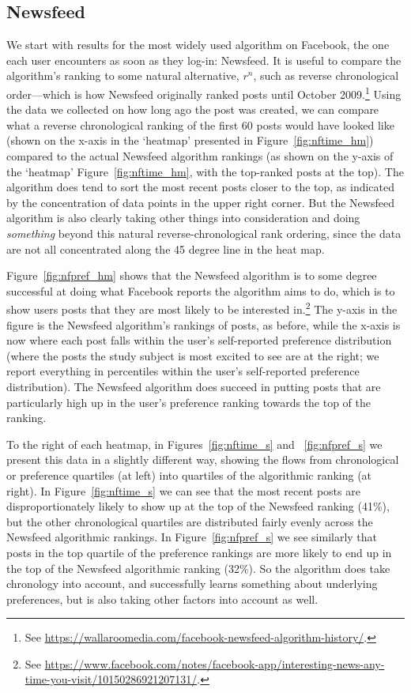 \documentclass[12pt,letterpaper]{article}
\begin{document}
\subsection{Newsfeed}

We start with results for the most widely used algorithm on Facebook, the one each user encounters as soon as they log-in: Newsfeed. It is useful to compare the algorithm's ranking to some natural alternative, $r^n$, such as reverse chronological order---which is how Newsfeed originally ranked posts until October 2009.\footnote{See \url{https://wallaroomedia.com/facebook-newsfeed-algorithm-history/}.} Using the data we collected on how long ago the post was created, we can compare what a reverse chronological ranking of the first 60 posts would have looked like (shown on the x-axis in the `heatmap' presented in Figure~\ref{fig:nftime_hm}) compared to the actual Newsfeed algorithm rankings (as shown on the y-axis of the `heatmap' Figure~\ref{fig:nftime_hm}, with the top-ranked posts at the top). The algorithm does tend to sort the most recent posts closer to the top, as indicated by the concentration of data points in the upper right corner. But the Newsfeed algorithm is also clearly taking other things into consideration and doing \emph{something} beyond this natural reverse-chronological rank ordering, since the data are not all concentrated along the 45 degree line in the heat map.

Figure~\ref{fig:nfpref_hm} shows that the Newsfeed algorithm is to some degree successful at doing what Facebook reports the algorithm aims to do, which is to show users posts that they are most likely to be interested in.\footnote{See \url{https://www.facebook.com/notes/facebook-app/interesting-news-any-time-you-visit/10150286921207131/}.} The y-axis in the figure is the Newsfeed algorithm's rankings of posts, as before, while the x-axis is now where each post falls within the user's self-reported preference distribution (where the posts the study subject is most excited to see are at the right; we report everything in percentiles within the user's self-reported preference distribution). The Newsfeed algorithm does succeed in putting posts that are particularly high up in the user's preference ranking towards the top of the ranking.

To the right of each heatmap, in Figures~\ref{fig:nftime_s} and ~\ref{fig:nfpref_s} we present this data in a slightly different way, showing the flows from chronological or preference quartiles (at left) into quartiles of the algorithmic ranking (at right). In Figure~\ref{fig:nftime_s} we can see that the most recent posts are disproportionately likely to show up at the top of the Newsfeed ranking (41\%), but the other chronological quartiles are distributed fairly evenly across the Newsfeed algorithmic rankings. In Figure~\ref{fig:nfpref_s} we see similarly that posts in the top quartile of the preference rankings are more likely to end up in the top of the Newsfeed algorithmic ranking (32\%). So the algorithm does take chronology into account, and successfully learns something about underlying preferences, but is also taking other factors into account as well.
\end{document}
